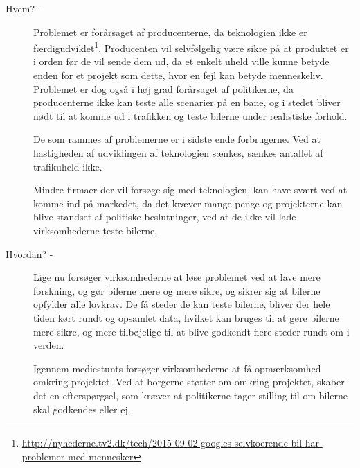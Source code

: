 \documentclass{article}
\begin{document}
\begin{description}
		\item[Hvem? -] Problemet er forårsaget af producenterne, da teknologien ikke er færdigudviklet\footnote{\url{http://nyhederne.tv2.dk/tech/2015-09-02-googles-selvkoerende-bil-har-problemer-med-mennesker}}. Producenten vil selvfølgelig være sikre på at produktet er i orden før de vil sende dem ud, da et enkelt uheld ville kunne betyde enden for et projekt som dette, hvor en fejl kan betyde menneskeliv. Problemet er dog også i høj grad forårsaget af politikerne, da producenterne ikke kan teste alle scenarier på en bane, og i stedet bliver nødt til at komme ud i trafikken og teste bilerne under realistiske forhold. 

		De som rammes af problemerne er i sidste ende forbrugerne. Ved at hastigheden af udviklingen af teknologien sænkes, sænkes antallet af trafikuheld ikke. 

		Mindre firmaer der vil forsøge sig med teknologien, kan have svært ved at komme ind på markedet, da det kræver mange penge og projekterne kan blive standset af politiske beslutninger, ved at de ikke vil lade virksomhederne teste bilerne.

		\item[Hvordan? -] Lige nu forsøger virksomhederne at løse problemet ved at lave mere forskning, og gør bilerne mere og mere sikre, og sikrer sig at bilerne opfylder alle lovkrav. De få steder de kan teste bilerne, bliver der hele tiden kørt rundt og opsamlet data, hvilket kan bruges til at gøre bilerne mere sikre, og mere tilbøjelige til at blive godkendt flere steder rundt om i verden.

		Igennem mediestunts forsøger virksomhederne at få opmærksomhed omkring projektet. Ved at borgerne støtter om omkring projektet, skaber det en efterspørgsel, som kræver at politikerne tager stilling til om bilerne skal godkendes eller ej. 
	\end{description}
\end{document}
